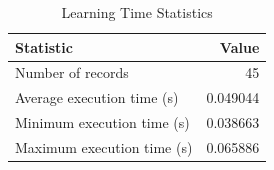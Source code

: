 
\begin{table}[h!]
\centering
\begin{tabular}{l r}
\hline
Statistic & Value \\
\hline
Number of records & 45 \\
Average execution time (s) & 0.049044 \\
Minimum execution time (s) & 0.038663 \\
Maximum execution time (s) & 0.065886 \\
\hline
\end{tabular}
\caption{Learning Time Statistics}
\end{table}
